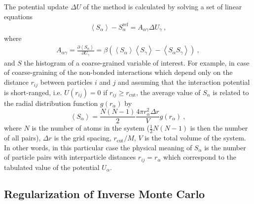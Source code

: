 The potential update $\Delta U$ of the \imc method is calculated by solving a set of linear equations
\begin{align}
    \left<S_{\alpha}\right> - S_{\alpha}^{\text{ref}}= A_{\alpha \gamma} \Delta U_{\gamma}~,
  \label{eq:imc}
\end{align}
%
where
\begin{eqnarray}
  \label{eq:covariance}
  A_{\alpha \gamma} = \frac{\partial \left< S_{\alpha} \right> }{\partial U_{\gamma}}  =
  \beta \left( \left<S_{\alpha} \right>\left<S_{\gamma} \right> - \left<S_{\alpha} S_{\gamma} \right>  \right)~,
  \nonumber
\end{eqnarray}
and $S$ the histogram of a coarse-grained variable of interest. For example, in case of coarse-graining of the non-bonded interactions which depend only on the distance $r_{ij}$ between particles $i$ and $j$ and assuming that the interaction potential is short-ranged, i.e. $U(r_{ij})=0$ if $r_{ij} \ge r_{\text{cut} }$, the average value of $S_{\alpha}$ is related to the radial distribution function $g(r_{\alpha})$ by
%
\begin{equation}
   \left< S_{\alpha} \right> =  \frac{N(N-1)}{2} \frac{4 \pi r_{\alpha}^2 \Delta r} {V}g(r_{\alpha})~,
  \label{eq:s_mean}
\end{equation}
%
where $N$ is the number of atoms in the system ($\frac{1}{2} N(N-1)$ is then the number of all pairs), $\Delta r$ is the grid spacing, $r_{\text{cut}}/M$, $V$ is the total volume of the system. In other words, in this particular case the physical meaning of $S_{\alpha}$ is the number of particle pairs with interparticle distances $r_{ij} = r_{\alpha}$ which correspond to the tabulated value of the potential $U_{\alpha}$.

\subsection{Regularization of Inverse Monte Carlo}

